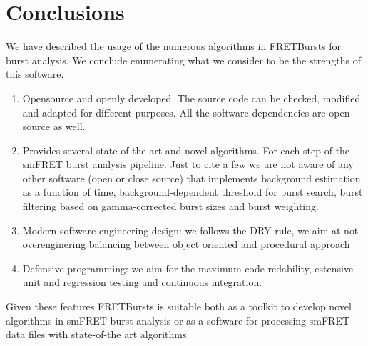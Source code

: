 \section{Conclusions}

We have described the usage of the numerous algorithms in FRETBursts
for burst analysis. We conclude enumerating what we consider to be the strengths
of this software.

\begin{enumerate}
\item Opensource and openly developed. The source code can be checked, modified and
adapted for different purposes. All the software dependencies are open source as well.
\item Provides several state-of-the-art and novel algorithms. For each step of the 
smFRET burst analysis pipeline. Just to cite a few we are not aware of any other software
(open or close source) that implements background estimation as a function of time,
background-dependent threshold for burst search, burst filtering based on 
gamma-corrected burst sizes and burst weighting.
\item Modern software engineering design: we follows the DRY rule, we aim at not
overenginering balancing between object oriented and procedural approach
\item Defensive programming: we aim for the maximum code redability,
estensive unit and regression testing and continuous integration.
\end{enumerate}

Given these features FRETBursts is suitable both as a toolkit to develop novel algorithms
in smFRET burst analysis or as a software for processing smFRET data files with
state-of-the art algorithms.
